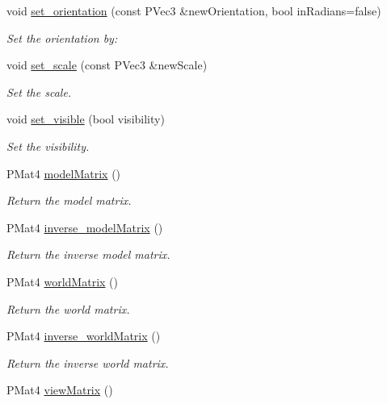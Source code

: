 \begin{DoxyCompactItemize}
void \mbox{\hyperlink{classprz_1_1_transform_a9fb424ad34746fad71d7138ceb467841}{set\+\_\+orientation}} (const P\+Vec3 \&new\+Orientation, bool in\+Radians=false)
\begin{DoxyCompactList}\small\item\em Set the orientation by\+: \end{DoxyCompactList}\item 
void \mbox{\hyperlink{classprz_1_1_transform_ae2672232dfdeedb5952793fd52fc6bf6}{set\+\_\+scale}} (const P\+Vec3 \&new\+Scale)
\begin{DoxyCompactList}\small\item\em Set the scale. \end{DoxyCompactList}\item 
void \mbox{\hyperlink{classprz_1_1_transform_a46563ee73c1091eaf544f88271fed16e}{set\+\_\+visible}} (bool visibility)
\begin{DoxyCompactList}\small\item\em Set the visibility. \end{DoxyCompactList}\item 
P\+Mat4 \mbox{\hyperlink{classprz_1_1_transform_a18dd340b1dd295aac8cfb9a2846eb77f}{model\+Matrix}} ()
\begin{DoxyCompactList}\small\item\em Return the model matrix. \end{DoxyCompactList}\item 
P\+Mat4 \mbox{\hyperlink{classprz_1_1_transform_a7d3ed4bf1ab8efed786e48632b70422e}{inverse\+\_\+model\+Matrix}} ()
\begin{DoxyCompactList}\small\item\em Return the inverse model matrix. \end{DoxyCompactList}\item 
P\+Mat4 \mbox{\hyperlink{classprz_1_1_transform_a070208f421673057bf4cd311a3cc05f3}{world\+Matrix}} ()
\begin{DoxyCompactList}\small\item\em Return the world matrix. \end{DoxyCompactList}\item 
P\+Mat4 \mbox{\hyperlink{classprz_1_1_transform_a729dc939d6f4ac013bcf2a675c5521c4}{inverse\+\_\+world\+Matrix}} ()
\begin{DoxyCompactList}\small\item\em Return the inverse world matrix. \end{DoxyCompactList}\item 
P\+Mat4 \mbox{\hyperlink{classprz_1_1_transform_a2e5dce185d946609698e708e0898c909}{view\+Matrix}} ()

\end{DoxyCompactItemize}
